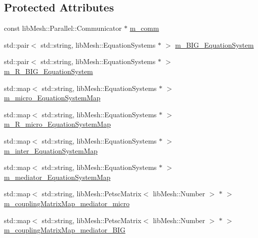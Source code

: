 \subsection*{Protected Attributes}
\begin{DoxyCompactItemize}
\item 
const lib\+Mesh\+::\+Parallel\+::\+Communicator $\ast$ \hyperlink{classcarl_1_1assemble__coupling__matrices_a8a2164781f1a5f75ab1a5c7c4744f2f4}{m\+\_\+comm}
\item 
std\+::pair$<$ std\+::string, lib\+Mesh\+::\+Equation\+Systems $\ast$ $>$ \hyperlink{classcarl_1_1assemble__coupling__matrices_a74638b62015299b30afb23168b141429}{m\+\_\+\+B\+I\+G\+\_\+\+Equation\+System}
\item 
std\+::pair$<$ std\+::string, lib\+Mesh\+::\+Equation\+Systems $\ast$ $>$ \hyperlink{classcarl_1_1assemble__coupling__matrices_ac8e2172182aa563e854e7b693344b301}{m\+\_\+\+R\+\_\+\+B\+I\+G\+\_\+\+Equation\+System}
\item 
std\+::map$<$ std\+::string, lib\+Mesh\+::\+Equation\+Systems $\ast$ $>$ \hyperlink{classcarl_1_1assemble__coupling__matrices_a13fddbcb853df9b7ce1a99062fb9f8b6}{m\+\_\+micro\+\_\+\+Equation\+System\+Map}
\item 
std\+::map$<$ std\+::string, lib\+Mesh\+::\+Equation\+Systems $\ast$ $>$ \hyperlink{classcarl_1_1assemble__coupling__matrices_a5b7c4f9307a9611926dc1ccf8bb33d4b}{m\+\_\+\+R\+\_\+micro\+\_\+\+Equation\+System\+Map}
\item 
std\+::map$<$ std\+::string, lib\+Mesh\+::\+Equation\+Systems $\ast$ $>$ \hyperlink{classcarl_1_1assemble__coupling__matrices_a6c9fab72397ed371acccbf88fd72665f}{m\+\_\+inter\+\_\+\+Equation\+System\+Map}
\item 
std\+::map$<$ std\+::string, lib\+Mesh\+::\+Equation\+Systems $\ast$ $>$ \hyperlink{classcarl_1_1assemble__coupling__matrices_a9d61d2378c5658d6cfc7fa0d2ef306a5}{m\+\_\+mediator\+\_\+\+Equation\+System\+Map}
\item 
std\+::map$<$ std\+::string, lib\+Mesh\+::\+Petsc\+Matrix$<$ lib\+Mesh\+::\+Number $>$ $\ast$ $>$ \hyperlink{classcarl_1_1assemble__coupling__matrices_a73accf79c46d9ceab7f66f0e26c5e677}{m\+\_\+coupling\+Matrix\+Map\+\_\+mediator\+\_\+micro}
\item 
std\+::map$<$ std\+::string, lib\+Mesh\+::\+Petsc\+Matrix$<$ lib\+Mesh\+::\+Number $>$ $\ast$ $>$ \hyperlink{classcarl_1_1assemble__coupling__matrices_af8127910d360a01b1b9c9878f03282f4}{m\+\_\+coupling\+Matrix\+Map\+\_\+mediator\+\_\+\+B\+I\+G}
\item 

\end{DoxyCompactItemize}
